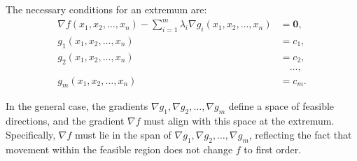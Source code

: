 \noindent The necessary conditions for an extremum are:
\[
\begin{aligned}
    \nabla f(x_1, x_2, \dots, x_n) - \sum_{i=1}^m \lambda_i \nabla g_i(x_1, x_2, \dots, x_n) &= \mathbf{0}, \\
    g_1(x_1, x_2, \dots, x_n) &= c_1, \\
    g_2(x_1, x_2, \dots, x_n) &= c_2, \\
    & \quad \dots, \\
    g_m(x_1, x_2, \dots, x_n) &= c_m.
\end{aligned}
\]

\noindent In the general case, the gradients \( \nabla g_1, \nabla g_2, \dots, \nabla g_m \) define a space of feasible directions, and the gradient \( \nabla f \) must align with this space at the extremum. Specifically, \( \nabla f \) must lie in the span of \( \nabla g_1, \nabla g_2, \dots, \nabla g_m \), reflecting the fact that movement within the feasible region does not change \( f \) to first order.



